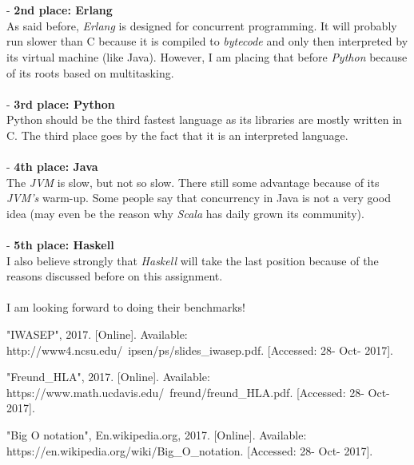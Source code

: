 \documentclass[conference]{IEEEtran}
\begin{document}
\\\\
- \textbf{2nd place: Erlang}\\
As said before, \textit{Erlang} is designed for concurrent programming. It will probably run slower than C because it is compiled to \textit{bytecode} and only then interpreted by its virtual machine (like Java). However, I am placing that before \textit{Python} because of its roots based on multitasking.
\\\\
- \textbf{3rd place: Python}\\
Python should be the third fastest language as its libraries are mostly written in C. The third place goes by the fact that it is an interpreted language.
\\\\
- \textbf{4th place: Java}\\
The \textit{JVM} is slow, but not so slow. There still some advantage because of its \textit{JVM's} warm-up. Some people say that concurrency in Java is not a very good idea (may even be the reason why \textit{Scala} has daily grown its community).
\\\\
- \textbf{5th place: Haskell}\\
I also believe strongly that \textit{Haskell} will take the last position because of the reasons discussed before on this assignment.
\\\\
I am looking forward to doing their benchmarks!

\begin{thebibliography}{00}
 "IWASEP", 2017. [Online]. Available: http://www4.ncsu.edu/~ipsen/ps/slides\_iwasep.pdf. [Accessed: 28- Oct- 2017].

 "Freund\_HLA", 2017. [Online]. Available: https://www.math.ucdavis.edu/~freund/freund\_HLA.pdf. [Accessed: 28- Oct- 2017].

 "Big O notation", En.wikipedia.org, 2017. [Online]. Available: https://en.wikipedia.org/wiki/Big\_O\_notation. [Accessed: 28- Oct- 2017].


\end{thebibliography}
\end{document}
